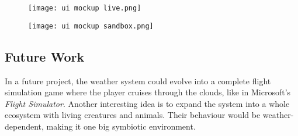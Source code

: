 \begin{figure}[H]
    \centering
    \texttt{[image: ui mockup live.png]}
    \label{img:ui:mockup:live}
\end{figure}

\begin{figure}[H]
    \centering
    \texttt{[image: ui mockup sandbox.png]}
    \label{img:ui:mockup:sandbox}
\end{figure}

\subsection{Future Work}
In a future project, the weather system could evolve into a complete flight simulation game where the player cruises through the clouds, like in Microsoft's \emph{Flight Simulator}.
Another interesting idea is to expand the system into a whole ecosystem with living creatures and animals. Their behaviour would be weather-dependent, making it one big symbiotic environment.